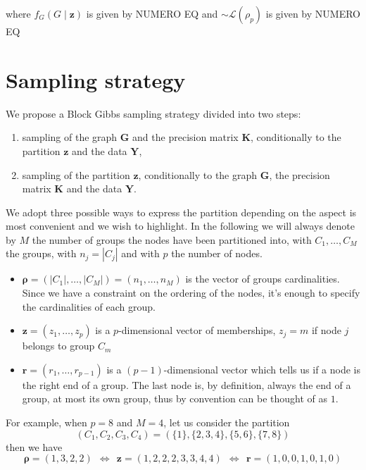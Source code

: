 where $f_G(G\mid\mathbf{z})$ is given by NUMERO EQ and $\sim \mathcal{L}(\rho_p)$ is given by NUMERO EQ


\section{Sampling strategy}
We propose a Block Gibbs sampling strategy divided into two steps: 
\begin{enumerate}
    \item sampling of the graph $\bm{G}$ and the precision matrix $\bm{K}$, conditionally to the partition $\bm{z}$ and the data $\bm{Y}$,
    \item sampling of the partition $\bm{z}$, conditionally to the graph $\bm{G}$, the precision matrix $\bm{K}$ and the data $\bm{Y}$.
\end{enumerate}
We adopt three possible ways to express the partition depending on the aspect is most convenient and we wish to highlight. In the following we will always denote by $M$ the number of groups the nodes have been partitioned into, with $C_{1}, \dotsc, C_{M}$ the groups, with $n_{j} = |C_{j}|$ and with $p$ the number of nodes.
\begin{itemize}
\item $\bm{\rho} =( |C_{1}| ,\dotsc ,|C_{M}|) =( n_{1} ,\dotsc ,n_{M})$ is the vector of groups cardinalities. Since we have a constraint on the ordering of the nodes, it's enough to specify the cardinalities of each group.
\item $\bm{z} =( z_{1} ,\dotsc ,z_{p})$ is a $p$-dimensional vector of memberships, $z_{j} =m$ if node $j$ belongs to group $C_{m}$
\item $\bm{r} =( r_{1} ,\dotsc ,r_{p-1})$ is a $( p-1)$-dimensional vector which tells us if a node is the right end of a group. The last node is, by definition, always the end of a group, at most its own group, thus by convention can be thought of as $1$.
\end{itemize}
For example, when $p=8$ and $M=4$, let us consider the partition
\[
    (C_{1}, C_{2}, C_{3}, C_{4}) = (\{1\},\{2,3,4\},\{5,6\},\{7,8\})
\]
then we have
\begin{equation*}
\bm{\rho} =( 1,3,2,2) \ \ \iff \ \ \bm{z} =( 1,2,2,2,3,3,4,4) \ \ \iff \ \ \bm{r} =( 1,0,0,1,0,1,0)
\end{equation*}

